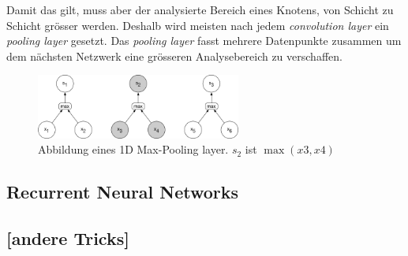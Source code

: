 Damit das gilt, muss aber der analysierte Bereich eines Knotens, von Schicht zu Schicht grösser werden. Deshalb wird meisten nach jedem \textit{convolution layer} ein \textit{pooling layer} gesetzt. Das \textit{pooling layer} fasst mehrere Datenpunkte zusammen um dem nächsten Netzwerk eine grösseren Analysebereich zu verschaffen.
\begin{figure}[hbt]
	\centering
		\includegraphics[width=0.6\textwidth]{assets/pooling_1d.png}
	\caption{Abbildung eines 1D Max-Pooling layer. $s_2$ ist $\max (x3, x4)$}
	\label{img:pool}
\end{figure}


\subsection{Recurrent Neural Networks}
\subsection{[andere Tricks]}